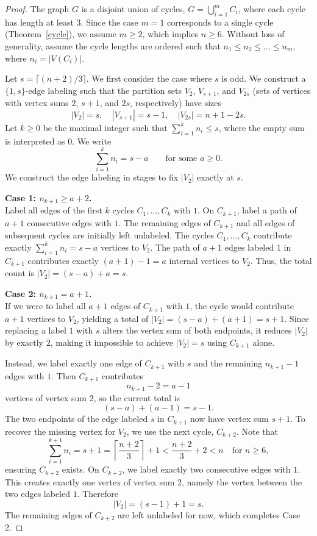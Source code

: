 \documentclass[11pt]{article}
\numberwithin{equation}{section}
\begin{document}
\begin{proof}
The graph $G$ is a disjoint union of cycles, $G=\bigcup_{i=1}^m C_i$, where each cycle has length at least $3$. Since the case $m=1$ corresponds to a single cycle (Theorem~\ref{cycle}), we assume $m\ge 2$, which implies $n\ge 6$. Without loss of generality, assume the cycle lengths are ordered such that $n_1 \le n_2 \le \dots \le n_m$, where $n_i = |V(C_i)|$.

Let $s=\lceil (n+2)/3\rceil$. We first consider the case where $s$ is odd. We construct a $\{1,s\}$-edge labeling such that the partition sets $V_2$, $V_{s+1}$, and $V_{2s}$ (sets of vertices with vertex sums $2$, $s+1$, and $2s$, respectively) have sizes
\[
|V_2|=s, \quad |V_{s+1}|=s-1, \quad |V_{2s}|=n+1-2s.
\]
Let $k\ge 0$ be the maximal integer such that $\sum_{i=1}^{k} n_i \le s$, where the empty sum is interpreted as $0$. We write
\[
\sum_{i=1}^{k} n_i = s-a \qquad \text{for some } a \ge 0.
\]
We construct the edge labeling in stages to fix $|V_2|$ exactly at $s$.

\smallskip
\noindent
\textbf{Case 1: $n_{k+1} \ge a+2$.} \\
Label all edges of the first $k$ cycles $C_1, \dots, C_k$ with $1$. On $C_{k+1}$, label a path of $a+1$ consecutive edges with $1$. The remaining edges of $C_{k+1}$ and all edges of subsequent cycles are initially left unlabeled. The cycles $C_1, \dots, C_k$ contribute exactly $\sum_{i=1}^k n_i = s-a$ vertices to $V_2$. The path of $a+1$ edges labeled $1$ in $C_{k+1}$ contributes exactly $(a+1)-1 = a$ internal vertices to $V_2$. Thus, the total count is $|V_2| = (s-a) + a = s$.

\smallskip
\noindent
\textbf{Case 2: $n_{k+1} = a+1$.} \\
If we were to label all $a+1$ edges of $C_{k+1}$ with $1$, the cycle would contribute $a+1$ vertices to $V_2$, yielding a total of $|V_2| = (s-a) + (a+1) = s+1$. Since replacing a label $1$ with $s$ alters the vertex sum of both endpoints, it reduces $|V_2|$ by exactly $2$, making it impossible to achieve $|V_2|=s$ using $C_{k+1}$ alone.

Instead, we label exactly one edge of $C_{k+1}$ with $s$ and the remaining $n_{k+1}-1$ edges with $1$. Then $C_{k+1}$ contributes
\[
n_{k+1}-2=a-1
\]
vertices of vertex sum $2$, so the current total is
\[
(s-a)+(a-1)=s-1.
\]
The two endpoints of the edge labeled $s$ in $C_{k+1}$ now have vertex sum $s+1$. To recover the missing vertex for $V_2$, we use the next cycle, $C_{k+2}$. Note that
\[
\sum_{i=1}^{k+1} n_i = s+1 =\left\lceil\frac{n+2}{3}\right\rceil+1 < \frac{n+2}{3}  + 2< n \quad \text{for } n \ge 6,
\]
ensuring $C_{k+2}$ exists. On $C_{k+2}$, we label exactly two consecutive edges with $1$. This creates exactly one vertex of vertex sum $2$, namely the vertex between the two edges labeled $1$. Therefore
\[
|V_2|=(s-1)+1=s.
\]
The remaining edges of $C_{k+2}$ are left unlabeled for now, which completes Case 2.


\end{proof}
\end{document}
